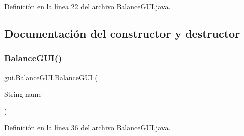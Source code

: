Definición en la línea 22 del archivo Balance\+G\+U\+I.\+java.



\subsection{Documentación del constructor y destructor}
\mbox{\label{classgui_1_1BalanceGUI_ac60ad0190bd317910d391735bb8ff888}} 
\subsubsection{\texorpdfstring{BalanceGUI()}{BalanceGUI()}}
{\footnotesize\ttfamily gui.\+Balance\+G\+U\+I.\+Balance\+G\+UI (\begin{DoxyParamCaption}\item[{String}]{name }\end{DoxyParamCaption})}



Definición en la línea 36 del archivo Balance\+G\+U\+I.\+java.


